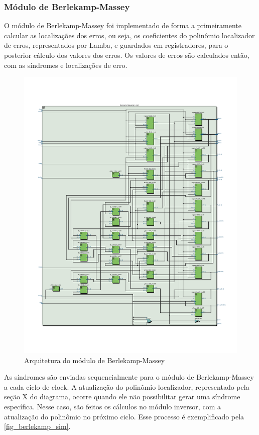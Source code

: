 	\subsubsection{Módulo de Berlekamp-Massey}
	
	O módulo de Berlekamp-Massey foi implementado de forma a primeiramente calcular as localizações dos erros, ou seja, os coeficientes do polinômio localizador de erros, representados por Lamba, e guardados em registradores, para o posterior cálculo dos valores dos erros. Os valores de erros são calculados então, com as síndromes e localizações de erro.
	
	\begin{figure}[!htb]
		\caption{\label{fig_berlekamp_arq} Arquitetura do módulo de Berlekamp-Massey}
		\centering
		\includegraphics[width=1\textwidth]{RS/BerlekampRTL.pdf}
		\legend{}
	\end{figure}
	
	As síndromes são enviadas sequencialmente para o módulo de Berlekamp-Massey a cada ciclo de clock. A atualização do polinômio localizador, representado pela seção X do diagrama, ocorre quando ele não possibilitar gerar uma síndrome específica. Nesse caso, são feitos os cálculos no módulo inversor, com a atualização do polinômio no próximo ciclo. Esse processo é exemplificado pela \autoref{fig_berlekamp_sim}.
	
